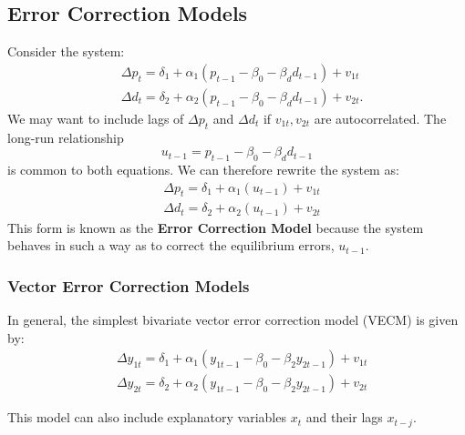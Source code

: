 \documentclass[11pt]{article}
\begin{document}
\subsection{Error Correction Models}

Consider the system:
\begin{equation}
\begin{aligned}
& \Delta p_t=\delta_1+\alpha_1\left(p_{t-1}-\beta_0-\beta_d d_{t-1}\right)+v_{1 t} \\
& \Delta d_t=\delta_2+\alpha_2\left(p_{t-1}-\beta_0-\beta_d d_{t-1}\right)+v_{2 t} .
\end{aligned}
\end{equation}
We may want to include lags of $\Delta p_t$ and $\Delta d_t$ if $v_{1t}, v_{2t}$ are autocorrelated. The long-run relationship
\[u_{t-1} = p_{t-1} - \beta_0 - \beta_d d_{t-1}\]
is common to both equations. We can therefore rewrite the system as:
\begin{equation}
\begin{aligned}
& \Delta p_t=\delta_1+\alpha_1\left(u_{t-1}\right)+v_{1 t} \\
& \Delta d_t=\delta_2+\alpha_2\left(u_{t-1}\right)+v_{2 t}
\end{aligned}
\end{equation}
This form is known as the \textbf{Error Correction Model} because the system behaves in such a way as to correct the equilibrium errors, $u_{t-1}$.

\subsubsection{Vector Error Correction Models}

In general, the simplest bivariate vector error correction model (VECM) is given by:
\begin{equation}
\begin{aligned}
& \Delta y_{1 t}=\delta_1+\alpha_1\left(y_{1 t-1}-\beta_0-\beta_2 y_{2 t-1}\right)+v_{1 t} \\
& \Delta y_{2 t}=\delta_2+\alpha_2\left(y_{1 t-1}-\beta_0-\beta_2 y_{2 t-1}\right)+v_{2 t}
\end{aligned}
\end{equation}

This model can also include explanatory variables $x_t$ and their lags $x_{t-j}$.
\end{document}
